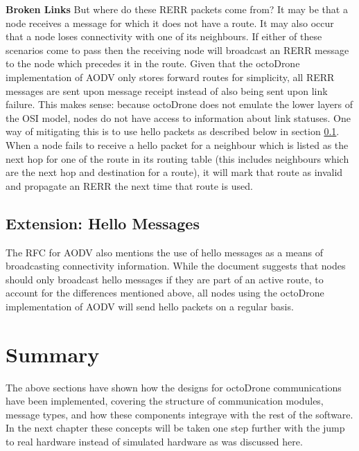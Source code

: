 \noindent\textbf{Broken Links}
But where do these RERR packets come from? It may be that a node receives a message for which it does not have a route. It may also occur that a node loses connectivity with one of its neighbours. If either of these scenarios come to pass then the receiving node will broadcast an RERR message to the node which precedes it in the route. Given that the octoDrone implementation of AODV only stores forward routes for simplicity, all RERR messages are sent upon message receipt instead of also being sent upon link failure. This makes sense: because octoDrone does not emulate the lower layers of the OSI model, nodes do not have access to information about link statuses. One way of mitigating this is to use hello packets as described below in section \ref{hello}. When a node fails to receive a hello packet for a neighbour which is listed as the next hop for one of the route in its routing table (this includes neighbours which are the next hop and destination for a route), it will mark that route as invalid and propagate an RERR the next time that route is used.

\subsection{Extension: Hello Messages}
\label{hello}
The RFC for AODV also mentions the use of hello messages as a means of broadcasting connectivity information. While the document suggests that nodes should only broadcast hello messages if they are part of an active route, to account for the differences mentioned above, all nodes using the octoDrone implementation of AODV will send hello packets on a regular basis.

\section{Summary}
The above sections have shown how the designs for octoDrone communications have been implemented, covering the structure of communication modules, message types, and how these components integraye with the rest of the software. In the next chapter these concepts will be taken one step further with the jump to real hardware instead of simulated hardware as was discussed here.

